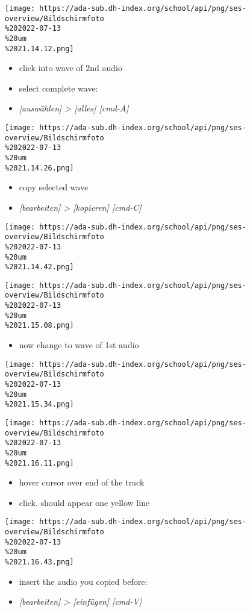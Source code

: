 \documentclass[
  12pt,
]{article}
\providecommand{\tightlist}{%
  \setlength{\itemsep}{0pt}\setlength{\parskip}{0pt}}
\begin{document}
\texttt{[image: https://ada-sub.dh-index.org/school/api/png/ses-overview/Bildschirmfoto\\\%202022-07-13\\\%20um\\\%2021.14.12.png]}

\begin{itemize}
\tightlist
\item
  click into wave of 2nd audio
\item
  select complete wave:
\item
  \emph{{[}auswählen{]} \textgreater{} {[}alles{]} {[}cmd-A{]}}
\end{itemize}

\texttt{[image: https://ada-sub.dh-index.org/school/api/png/ses-overview/Bildschirmfoto\\\%202022-07-13\\\%20um\\\%2021.14.26.png]}

\begin{itemize}
\tightlist
\item
  copy selected wave
\item
  \emph{{[}bearbeiten{]} \textgreater{} {[}kopieren{]} {[}cmd-C{]}}
\end{itemize}

\texttt{[image: https://ada-sub.dh-index.org/school/api/png/ses-overview/Bildschirmfoto\\\%202022-07-13\\\%20um\\\%2021.14.42.png]}

\texttt{[image: https://ada-sub.dh-index.org/school/api/png/ses-overview/Bildschirmfoto\\\%202022-07-13\\\%20um\\\%2021.15.08.png]}

\begin{itemize}
\tightlist
\item
  now change to wave of 1st audio
\end{itemize}

\texttt{[image: https://ada-sub.dh-index.org/school/api/png/ses-overview/Bildschirmfoto\\\%202022-07-13\\\%20um\\\%2021.15.34.png]}

\texttt{[image: https://ada-sub.dh-index.org/school/api/png/ses-overview/Bildschirmfoto\\\%202022-07-13\\\%20um\\\%2021.16.11.png]}

\begin{itemize}
\tightlist
\item
  hover cursor over end of the track
\item
  click. should appear one yellow line
\end{itemize}

\texttt{[image: https://ada-sub.dh-index.org/school/api/png/ses-overview/Bildschirmfoto\\\%202022-07-13\\\%20um\\\%2021.16.43.png]}

\begin{itemize}
\tightlist
\item
  insert the audio you copied before:
\item
  \emph{{[}bearbeiten{]} \textgreater{} {[}einfügen{]} {[}cmd-V{]}}
\end{itemize}
\end{document}
